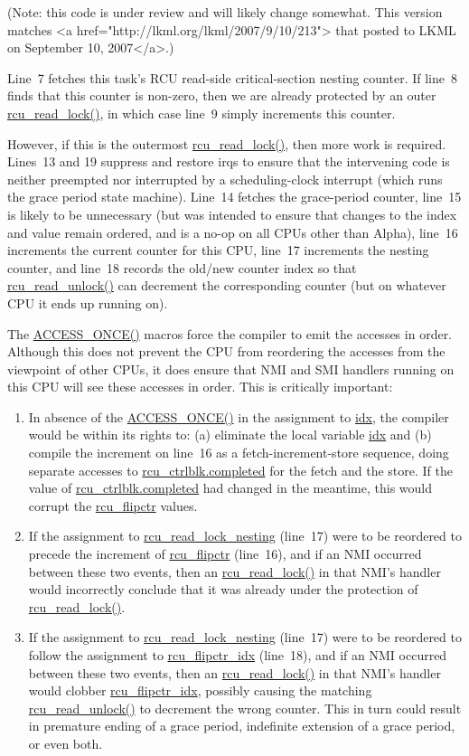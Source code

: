 (Note: this code is under review and will likely change somewhat.
This version matches
<a href="http://lkml.org/lkml/2007/9/10/213">
that posted to LKML on September 10, 2007</a>.)

Line~7 fetches this task's RCU read-side critical-section nesting
counter.
If line~8 finds that this counter is non-zero,
then we are already protected by an outer
\url{rcu_read_lock()}, in which case line~9 simply increments
this counter.

However, if this is the outermost \url{rcu_read_lock()},
then more work is required.
Lines~13 and 19 suppress and restore irqs to ensure that the
intervening code is neither preempted nor interrupted by a
scheduling-clock interrupt (which runs the grace period state machine).
Line~14 fetches the grace-period counter, line~15 is likely
to be unnecessary (but was intended to ensure that changes to the index
and value remain ordered, and is a no-op on all CPUs other than Alpha),
line~16 increments the current counter for
this CPU, line~17 increments the nesting counter,
and line~18 records the old/new counter index so that
\url{rcu_read_unlock()} can decrement the corresponding
counter (but on whatever CPU it ends up running on).

The \url{ACCESS_ONCE()} macros force the compiler to
emit the accesses in order.
Although this does not prevent the CPU from reordering the accesses
from the viewpoint of other CPUs, it does ensure that NMI and
SMI handlers running on this CPU will see these accesses in order.
This is critically important:

\begin{enumerate}
\item	In absence of the \url{ACCESS_ONCE()} in the assignment
	to \url{idx}, the compiler would be within its rights
	to: (a) eliminate the local variable \url{idx} and
	(b) compile the increment on line~16 as a
	fetch-increment-store sequence, doing separate accesses to
	\url{rcu_ctrlblk.completed} for the fetch and the
	store.
	If the value of \url{rcu_ctrlblk.completed} had
	changed in the meantime, this would corrupt the
	\url{rcu_flipctr} values.

\item	If the assignment to \url{rcu_read_lock_nesting}
	(line~17) were to be reordered to precede the increment
	of \url{rcu_flipctr} (line~16), and if an
	NMI occurred between these two events, then an
	\url{rcu_read_lock()} in that NMI's handler
	would incorrectly conclude that it was already under the
	protection of \url{rcu_read_lock()}.

\item	If the assignment to \url{rcu_read_lock_nesting}
        (line~17) were to be reordered to follow the assignment
	to \url{rcu_flipctr_idx} (line~18), and if an
	NMI occurred between these two events, then an
	\url{rcu_read_lock()} in that NMI's handler
	would clobber \url{rcu_flipctr_idx}, possibly
	causing the matching \url{rcu_read_unlock()} to
	decrement the wrong counter.
	This in turn could result in premature ending of a
	grace period, indefinite extension of a grace period,
	or even both.
\end{enumerate}

